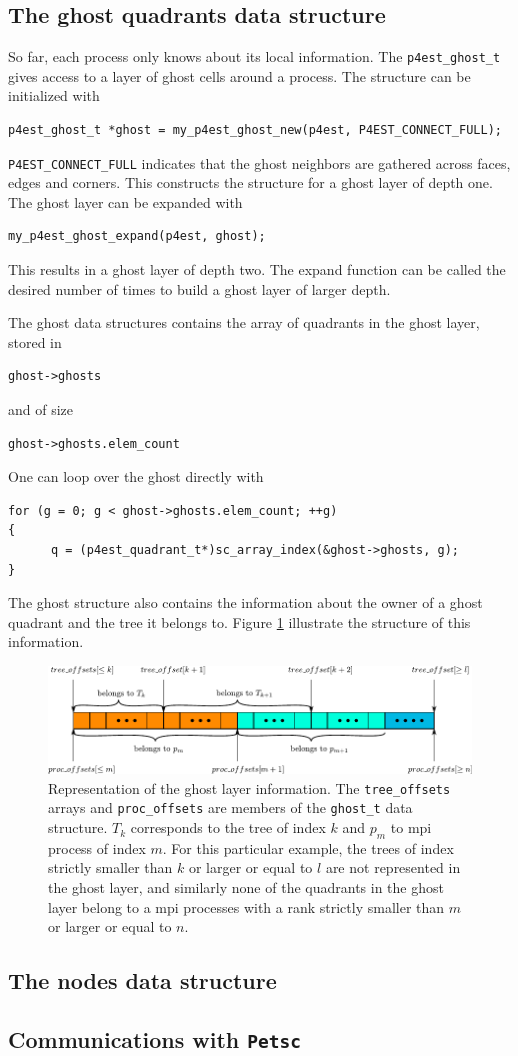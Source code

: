 \documentclass{article}
\newcommand{\ttt}[1]{\texttt{#1}}
\newcommand{\figb}{\begin{figure}[htbp]\begin{center}}
\newcommand{\fige}{\end{center}\end{figure}}
\begin{document}
\subsection{The ghost quadrants data structure}

So far, each process only knows about its local information. The \texttt{p4est\_ghost\_t} gives access to a layer of ghost cells around a process. The structure can be initialized with
\begin{Verbatim}[frame=single]
p4est_ghost_t *ghost = my_p4est_ghost_new(p4est, P4EST_CONNECT_FULL);
\end{Verbatim}
\ttt{P4EST\_CONNECT\_FULL} indicates that the ghost neighbors are gathered across faces, edges and corners. This constructs the structure for a ghost layer of depth one. The ghost layer can be expanded with
\begin{Verbatim}[frame=single]
my_p4est_ghost_expand(p4est, ghost);
\end{Verbatim}
This results in a ghost layer of depth two. The expand function can be called the desired number of times to build a ghost layer of larger depth.

The ghost data structures contains the array of quadrants in the ghost layer, stored in
\begin{Verbatim}[frame=single]
ghost->ghosts
\end{Verbatim}
and of size
\begin{Verbatim}[frame=single]
ghost->ghosts.elem_count
\end{Verbatim}
One can loop over the ghost directly with
\begin{Verbatim}[frame=single]
for (g = 0; g < ghost->ghosts.elem_count; ++g)
{
      q = (p4est_quadrant_t*)sc_array_index(&ghost->ghosts, g);
}
\end{Verbatim}
The ghost structure also contains the information about the owner of a ghost quadrant and the tree it belongs to. Figure \ref{fig::ghost_quadrants} illustrate the structure of this information.
\figb
\includegraphics[width=\textwidth]{figures/ghosts.pdf}
\caption{Representation of the ghost layer information. The \ttt{tree\_offsets} arrays and \ttt{proc\_offsets} are members of the \ttt{ghost\_t} data structure. $T_k$ corresponds to the tree of index $k$ and $p_m$ to mpi process of index $m$. For this particular example, the trees of index strictly smaller than $k$ or larger or equal to $l$ are not represented in the ghost layer, and similarly none of the quadrants in the ghost layer belong to a mpi processes with a rank strictly smaller than $m$ or larger or equal to $n$.} \label{fig::ghost_quadrants}
\fige

\subsection{The nodes data structure}

\subsection{Communications with \texttt{Petsc}}


\newpage


\end{document}
